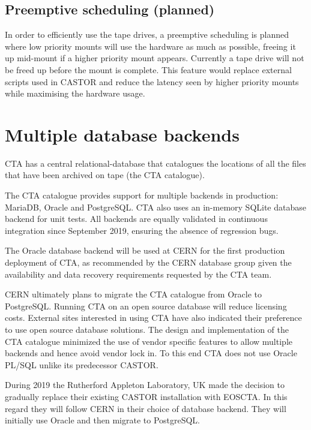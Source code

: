 \documentclass{webofc}
\begin{document}
\subsection{Preemptive scheduling (planned)}
In order to efficiently use the tape drives, a preemptive scheduling is planned where low priority mounts
will use the hardware as much as possible, freeing it up mid-mount if a higher priority mount
appears. Currently a tape drive will not be freed up before the mount is complete. This feature would 
replace external scripts used in CASTOR and reduce the latency seen by higher priority mounts while 
maximising the hardware usage.

\section{Multiple database backends}



CTA has a central relational-database that catalogues the locations of all the
files that have been archived on tape (the CTA catalogue).

The CTA catalogue provides support for multiple backends in production:  
MariaDB, Oracle and PostgreSQL. CTA also uses an in-memory SQLite database
backend for unit tests. All backends are equally validated in continuous
integration since September 2019, ensuring the absence of regression bugs.

The Oracle database backend will be used at CERN for the first production
deployment of CTA, as recommended by the CERN database group given the 
availability and data recovery requirements requested by the CTA team.

CERN ultimately plans to migrate the CTA catalogue from Oracle to PostgreSQL.
Running CTA on an open source database will reduce licensing costs. 
External sites interested in using CTA have also
indicated their preference to use open source database solutions.
The design and implementation of the CTA catalogue minimized the use 
of vendor specific features to allow multiple backends and hence avoid vendor lock in.
To this end CTA does not use Oracle PL/SQL unlike its predecessor CASTOR.

During 2019 the Rutherford Appleton Laboratory, UK made the decision to
gradually replace their existing CASTOR installation with EOSCTA. In this
regard they will follow CERN in their choice of database backend. They will
initially use Oracle and then migrate to PostgreSQL.
\end{document}
